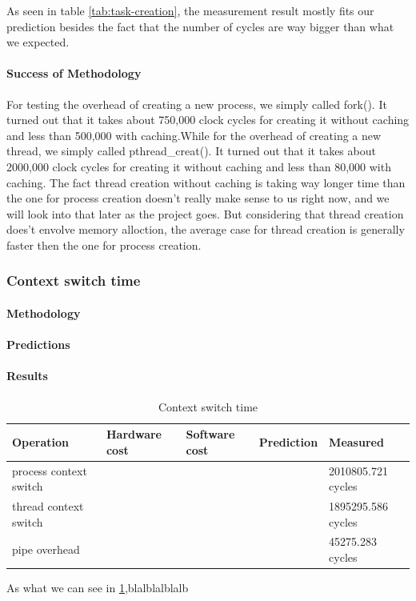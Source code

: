 As seen in table \ref{tab:task-creation}, the measurement result mostly fits our prediction besides the fact that the number of cycles are way bigger than what we expected.
\paragraph{Success of Methodology}
For testing the overhead of creating a new process, we simply called fork(). It turned out that it takes about 750,000 clock cycles for creating it without caching and less than 500,000 with caching.While for the overhead of creating a new thread, we simply called pthread\_creat(). It turned out that it takes about 2000,000 clock cycles for creating it without caching and less than 80,000 with caching.
The fact thread creation without caching is taking way longer time than the one for process creation doesn't really make sense to us right now, and we will look into that later as the project goes. But considering that thread creation does't envolve memory alloction, the average case for thread creation is generally faster then the one for process creation.


\subsubsection{Context switch time}
\paragraph{Methodology}
\paragraph{Predictions}
\paragraph{Results}
\begin{table}
\begin{center}
\begin{tabular}{| l | l | l | l | l |}
\hline
Operation 				& Hardware cost 	& Software cost 	& Prediction 	& Measured \\ \hline
process context switch 	& 				&				&			& 2010805.721 cycles \\ \hline
thread context switch 	& 				&				&			& 1895295.586 cycles \\ \hline
pipe overhead			& 				&				&			& 45275.283 cycles \\ \hline
\hline
\end{tabular}
\end{center}

\caption{Context switch time\label{tab:context-switch-time}}
\end{table}
As what we can see in \ref{tab:context-switch-time},blalblalblalb

